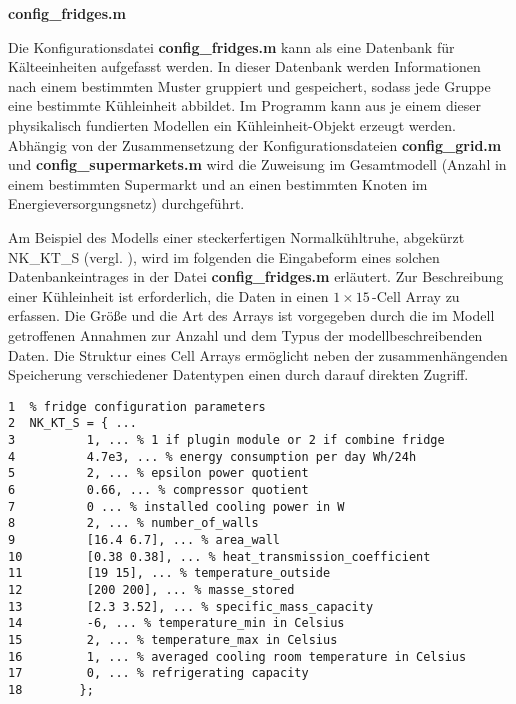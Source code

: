 \vspace{3mm}%
\noindent\textbf{config\_fridges.m}
\vspace{3mm}

Die Konfigurationsdatei \textbf{config\_fridges.m} kann als eine Datenbank für Kälteeinheiten aufgefasst werden. In dieser
Datenbank werden Informationen nach einem bestimmten Muster gruppiert und gespeichert, sodass jede Gruppe eine bestimmte
Kühleinheit abbildet. Im Programm kann aus je einem dieser physikalisch fundierten
Modellen ein Kühleinheit-Objekt erzeugt werden. Abhängig von der Zusammensetzung der
Konfigurationsdateien \textbf{config\_grid.m} und \textbf{config\_supermarkets.m} wird die Zuweisung im Gesamtmodell (Anzahl
in einem bestimmten Supermarkt und an einen bestimmten Knoten im Energieversorgungsnetz) durchgeführt.

Am Beispiel des Modells einer steckerfertigen Normalkühltruhe, abgekürzt NK\_KT\_S (vergl.
), wird im folgenden die Eingabeform eines solchen Datenbankeintrages in der Datei \textbf{config\_fridges.m}
erläutert. Zur Beschreibung einer Kühleinheit ist erforderlich, die Daten in einen $1\times15\,$-Cell Array zu erfassen.  Die
Größe und die Art des Arrays ist vorgegeben durch die im Modell getroffenen Annahmen zur Anzahl und dem
Typus der modellbeschreibenden Daten. Die Struktur eines Cell Arrays ermöglicht neben der zusammenhängenden Speicherung
verschiedener Datentypen einen durch \matlab darauf direkten Zugriff.

\begin{lstlisting}[caption=config\_fridges.m,label={fridge}]
1  % fridge configuration parameters
2  NK_KT_S = { ...
3          1, ... % 1 if plugin module or 2 if combine fridge
4          4.7e3, ... % energy consumption per day Wh/24h
5          2, ... % epsilon power quotient
6          0.66, ... % compressor quotient
7          0 ... % installed cooling power in W
8          2, ... % number_of_walls
9          [16.4 6.7], ... % area_wall
10         [0.38 0.38], ... % heat_transmission_coefficient
11         [19 15], ... % temperature_outside
12         [200 200], ... % masse_stored
13         [2.3 3.52], ... % specific_mass_capacity
14         -6, ... % temperature_min in Celsius
15         2, ... % temperature_max in Celsius
16         1, ... % averaged cooling room temperature in Celsius
17         0, ... % refrigerating capacity
18        };
\end{lstlisting}

